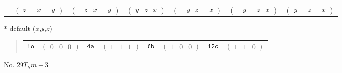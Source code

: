 \documentclass[fleqn,9pt,landscape]{jsarticle}
\begin{document}
\begin{center}
\begin{longtable}{ccccccc}
& $ \begin{pmatrix} z & - x & - y \end{pmatrix} $ & $ \begin{pmatrix} - z & x & - y \end{pmatrix} $ & $ \begin{pmatrix} y & z & x \end{pmatrix} $ & $ \begin{pmatrix} - y & z & - x \end{pmatrix} $ & $ \begin{pmatrix} - y & - z & x \end{pmatrix} $ & $ \begin{pmatrix} y & - z & - x \end{pmatrix} $ \\
\end{longtable}
\end{center}
* default ($x$,$y$,$z$)
\begin{quote}
\begin{tabular}{cccccccc}
$ {\tt 1o} $ & $ \begin{pmatrix} 0 & 0 & 0 \end{pmatrix} $ & $ {\tt 4a} $ & $ \begin{pmatrix} 1 & 1 & 1 \end{pmatrix} $ & $ {\tt 6b} $ & $ \begin{pmatrix} 1 & 0 & 0 \end{pmatrix} $ & $ {\tt 12c} $ & $ \begin{pmatrix} 1 & 1 & 0 \end{pmatrix} $
\end{tabular}
\end{quote}
\newpage
No. 29\quad$T_{h}$\quad$m-3$\quad[ cubic ]
\end{document}
